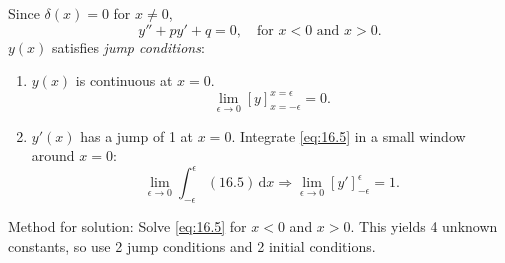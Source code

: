 \documentclass[10pt]{article}
\begin{document}
      Since $\delta(x)=0$ for $x\neq 0$, 
      \[
          y''+py'+q=0, \quad \text{for }x< 0 \text{ and }x>0
      .\]
      $y(x)$ satisfies \textit{jump conditions}: 
      \begin{enumerate}
          \item $y(x)$ is continuous at $x=0$.
          \[
              \lim_{\epsilon \to 0} [y]_{x=-\epsilon}^{x=\epsilon}=0
          .\]
          \item $y'(x)$ has a jump of 1 at $x=0$. Integrate \ref{eq:16.5} in a small window around $x=0$:
          \[
              \lim_{\epsilon \to 0} \int_{-\epsilon}^{\epsilon} (16.5) \,\mathrm{d}x \Longrightarrow \lim_{\epsilon \to 0} [y']_{-\epsilon}^{\epsilon} = 1
          .\]
      \end{enumerate}
      Method for solution: Solve \ref{eq:16.5} for $ x<0 $ and $x>0$. This yields 4 unknown constants, so use 2 jump conditions and 2 initial conditions.
\end{document}

